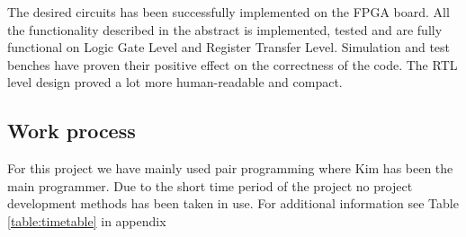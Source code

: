 The desired circuits has been successfully implemented on the FPGA board. All the functionality described in the abstract is implemented, tested and are fully functional on Logic Gate Level and Register Transfer Level. Simulation and test benches have proven their positive effect on the correctness of the code. The RTL level design proved a lot more human-readable and compact.

\subsection{Work process} 
For this project we have mainly used pair programming where Kim has been the main programmer.
Due to the short time period of the project no project development methods has been taken in use.
For additional information see Table \ref{table:timetable} in appendix 